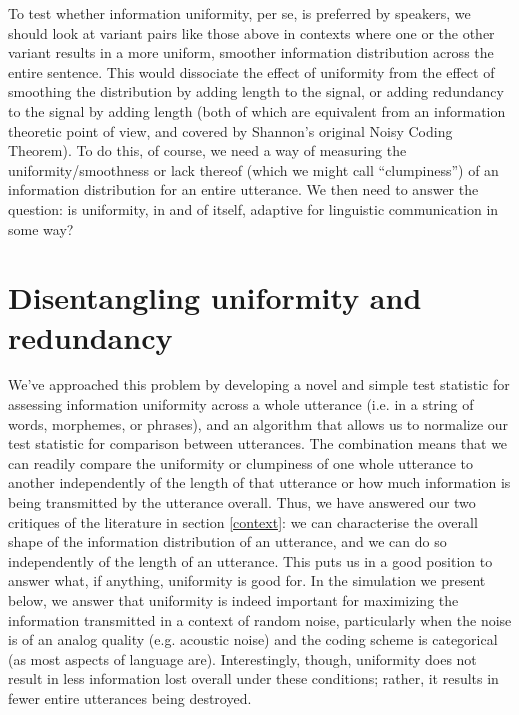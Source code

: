 \documentclass[12pt]{article}
\begin{document}
\noindent To test whether information uniformity, per se, is preferred by speakers, we should look at variant pairs like those above in contexts where one or the other variant results in a more uniform, smoother information distribution across the entire sentence. This would dissociate the effect of uniformity from the effect of smoothing the distribution by adding length to the signal, or adding redundancy to the signal by adding length (both of which are equivalent from an information theoretic point of view, and covered by Shannon's original Noisy Coding Theorem). To do this, of course, we need a way of measuring the uniformity/smoothness or lack thereof (which we might call ``clumpiness'') of an information distribution for an entire utterance. We then need to answer the question: is uniformity, in and of itself, adaptive for linguistic communication in some way?



\section{Disentangling uniformity and redundancy}
\label{disentangle}

We've approached this problem by developing a novel and simple test statistic for assessing information uniformity across a whole utterance (i.e. in a string of words, morphemes, or phrases), and an algorithm that allows us to normalize our test statistic for comparison between utterances. The combination means that we can readily compare the uniformity or clumpiness of one whole utterance to another independently of the length of that utterance or how much information is being transmitted by the utterance overall. Thus, we have answered our two critiques of the literature in section \ref{context}: we can characterise the overall shape of the information distribution of an utterance, and we can do so independently of the length of an utterance. This puts us in a good position to answer what, if anything, uniformity is good for. In the simulation we present below, we answer that uniformity is indeed important for maximizing the information transmitted in a context of random noise, particularly when the noise is of an analog quality (e.g. acoustic noise) and the coding scheme is categorical (as most aspects of language are). Interestingly, though, uniformity does not result in less information lost overall under these conditions; rather, it results in fewer entire utterances being destroyed.
\end{document}
